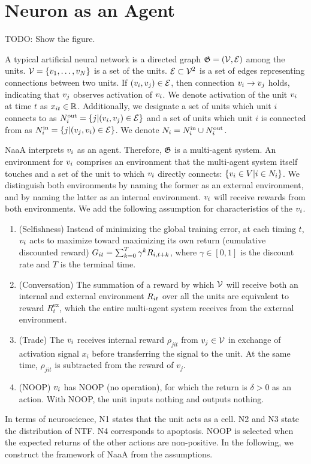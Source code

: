 \section{Neuron as an Agent}
TODO: Show the figure.

A typical artificial neural network is a directed graph $\mathfrak{G} = (\mathcal{V}, \mathcal{E})$ among the units.
$\mathcal{V} = \{v_{1}, \dots, v_{N}\}$ is a set of the units. $\mathcal{E} \subset \mathcal{V}^2$ is a set of edges representing connections between two units.
If $(v_{i}, v_{j}) \in \mathcal{E}$, then connection $v_{i} \rightarrow v_{j}$ holds, indicating that $v_{j}$ observes activation of $v_{i}$.
We denote activation of the unit $v_{i}$ at time $t$ as $x_{it} \in \mathbb{R}$.
Additionally, we designate a set of units which unit $i$ connects to as $N^\mathrm{out}_i = \{j | (v_{i}, v_{j}) \in \mathcal{E} \}$ and a set of units which unit $i$ is connected from as $N^\mathrm{in}_i = \{j | (v_{j}, v_{i}) \in \mathcal{E} \}$.
We denote $N_i = N^\mathrm{in}_i \cup N^\mathrm{out}_i$.

NaaA interprets $v_{i}$ as an agent.
Therefore, $\mathfrak{G}$ is a multi-agent system.
An environment for $v_{i}$ comprises an environment that the multi-agent system itself touches and a 
set of the unit to which $v_{i}$ directly connects: $\{v_i \in V | i \in N_i\}$.
We distinguish both environments by naming the former as an external environment, and by naming the latter as an internal environment.
$v_{i}$ will receive rewards from both environments.
We add the following assumption for characteristics of the $v_{i}$.
\begin{enumerate}
\renewcommand{\labelenumi}{N\arabic{enumi}:}
\item (Selfishness) 
	Instead of minimizing the global training error,
	at each timing $t$, $v_{i}$ acts to maximize toward maximizing its own return (cumulative discounted reward)
	$G_{it} = \sum_{k=0}^T \gamma^k R_{i,t+k}$, where $\gamma \in [0, 1]$ is the discount rate and $T$ is the terminal time.
\item (Conversation) 
	The summation of a reward by which $\mathcal{V}$ will receive both an internal and external environment $R_{it}$ over 
	all the units are equivalent to reward $R_t^{\mathrm{ex}}$, which the entire multi-agent system receives from 
	the external environment.
\item (Trade) 
	The $v_{i}$ receives internal reward $\rho_{jit}$ from $v_{j} \in \mathcal{V}$ in exchange of activation signal $x_i$
	before transferring the signal to the unit. At the same time, $\rho_{jit}$ is subtracted from the reward of $v_j$.
\item (NOOP) 
	$v_{i}$ has NOOP (no operation), for which the return is $\delta > 0$ as an action.
	With NOOP, the unit inputs nothing and outputs nothing.
\end{enumerate}
In terms of neuroscience,
N1 states that the unit acts as a cell.
N2 and N3 state the distribution of NTF. N4 corresponds to apoptosis.
NOOP is selected when the expected returns of the other actions are non-positive.
In the following, we construct the framework of NaaA from the assumptions.

